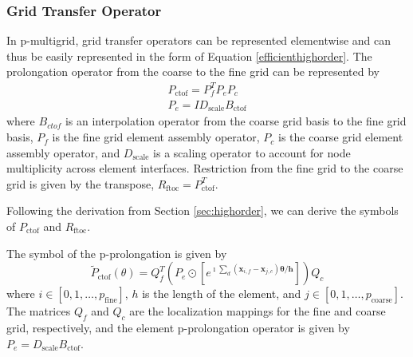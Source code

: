 \documentclass[review]{siamart190516}
\begin{document}
\subsubsection{Grid Transfer Operator}\label{sec:grids}

In p-multigrid, grid transfer operators can be represented elementwise and can thus be easily represented in the form of Equation \ref{efficienthighorder}.
The prolongation operator from the coarse to the fine grid can be represented by
\begin{equation}
\begin{split}
P_{\text{ctof}} = P_f^T P_e P_c\\
P_e = I D_{\text{scale}} B_{\text{ctof}}
\end{split}
\end{equation}
where $B_{ctof}$ is an interpolation operator from the coarse grid basis to the fine grid basis, $P_f$ is the fine grid element assembly operator, $P_c$ is the coarse grid element assembly operator, and $D_{\text{scale}}$ is a scaling operator to account for node multiplicity across element interfaces.
Restriction from the fine grid to the coarse grid is given by the transpose, $R_{\text{ftoc}} = P_{\text{ctof}}^T$.

Following the derivation from Section \ref{sec:highorder}, we can derive the symbols of $P_{\text{ctof}}$ and $R_{\text{ftoc}}$.

\begin{definition}
The symbol of the p-prolongation is given by
\begin{equation}
\tilde{P}_{\text{ctof}} \left( \theta \right) = Q_f^T \left( P_e \odot \left[ e^{\imath \sum_d \left( \mathbf{x}_{i, f} - \mathbf{x}_{j, c} \right) \mathbf{\theta} / \mathbf{h}} \right] \right) Q_c
\end{equation}
where $i \in \left[ 0, 1, \dots, p_{\text{fine}} \right]$, $h$ is the length of the element, and $j \in \left[ 0, 1, \dots, p_{\text{coarse}} \right]$.
The matrices $Q_f$ and $Q_c$ are the localization mappings for the fine and coarse grid, respectively, and the element p-prolongation operator is given by $P_e = D_{\text{scale}} B_{\text{ctof}}$.
\end{definition}\label{def:prolongation_symbol}
\end{document}

